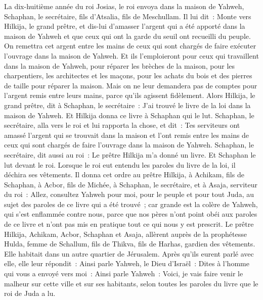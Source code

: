 \begin{multicols}{2}
La dix-huitième année du roi Josias, le roi envoya dans la maison de Yahweh, Schaphan, le secrétaire, fils d'Atsalia, fils de Meschullam.
Il lui dit~: Monte vers Hilkija, le grand prêtre, et dis-lui d'amasser l'argent qui a été apporté dans la maison de Yahweh et que ceux qui ont la garde du seuil ont recueilli du peuple.
On remettra cet argent entre les mains de ceux qui sont chargés de faire exécuter l'ouvrage dans la maison de Yahweh. Et ils l'emploieront pour ceux qui travaillent dans la maison de Yahweh, pour réparer les brèches de la maison,
pour les charpentiers, les architectes et les maçons, pour les achats du bois et des pierres de taille pour réparer la maison.
Mais on ne leur demandera pas de comptes pour l'argent remis entre leurs mains, parce qu'ils agissent fidèlement.
Alors Hilkija, le grand prêtre, dit à Schaphan, le secrétaire~: J'ai trouvé le livre de la loi dans la maison de Yahweh. Et Hilkija donna ce livre à Schaphan qui le lut.
Schaphan, le secrétaire, alla vers le roi et lui rapporta la chose, et dit~: Tes serviteurs ont amassé l'argent qui se trouvait dans la maison et l'ont remis entre les mains de ceux qui sont chargés de faire l'ouvrage dans la maison de Yahweh.
Schaphan, le secrétaire, dit aussi au roi~: Le prêtre Hilkija m'a donné un livre. Et Schaphan le lut devant le roi.
Lorsque le roi eut entendu les paroles du livre de la loi, il déchira ses vêtements.
Il donna cet ordre au prêtre Hilkija, à Achikam, fils de Schaphan, à Acbor, fils de Michée, à Schaphan, le secrétaire, et à Asaja, serviteur du roi~:
Allez, consultez Yahweh pour moi, pour le peuple et pour tout Juda, au sujet des paroles de ce livre qui a été trouvé~; car grande est la colère de Yahweh, qui s'est enflammée contre nous, parce que nos pères n'ont point obéi aux paroles de ce livre et n'ont pas mis en pratique tout ce qui nous y est prescrit.
Le prêtre Hilkija, Achikam, Acbor, Schaphan et Asaja, allèrent auprès de la prophétesse Hulda, femme de Schallum, fils de Thikva, fils de Harhas, gardien des vêtements. Elle habitait dans un autre quartier de Jérusalem.
Après qu'ils eurent parlé avec elle, elle leur répondit~: Ainsi parle Yahweh, le Dieu d'Israël~: Dites à l'homme qui vous a envoyé vers moi~:
Ainsi parle Yahweh~: Voici, je vais faire venir le malheur sur cette ville et sur ses habitants, selon toutes les paroles du livre que le roi de Juda a lu.

\end{multicols}

